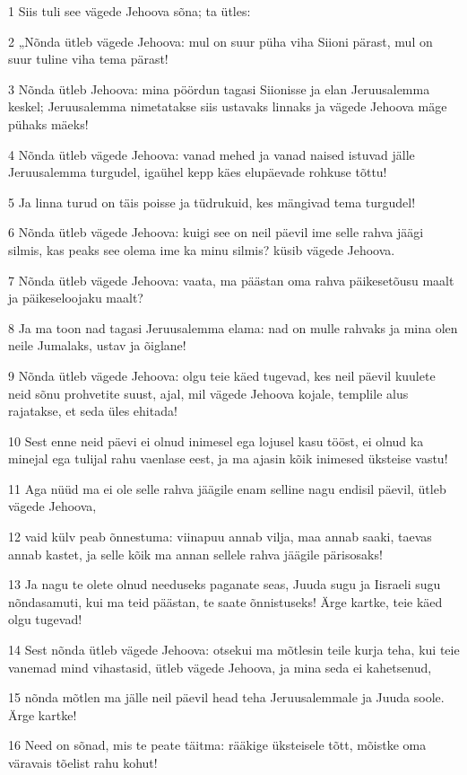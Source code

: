 \par 1 Siis tuli see vägede Jehoova sõna; ta ütles:
\par 2 „Nõnda ütleb vägede Jehoova: mul on suur püha viha Siioni pärast, mul on suur tuline viha tema pärast!
\par 3 Nõnda ütleb Jehoova: mina pöördun tagasi Siionisse ja elan Jeruusalemma keskel; Jeruusalemma nimetatakse siis ustavaks linnaks ja vägede Jehoova mäge pühaks mäeks!
\par 4 Nõnda ütleb vägede Jehoova: vanad mehed ja vanad naised istuvad jälle Jeruusalemma turgudel, igaühel kepp käes elupäevade rohkuse tõttu!
\par 5 Ja linna turud on täis poisse ja tüdrukuid, kes mängivad tema turgudel!
\par 6 Nõnda ütleb vägede Jehoova: kuigi see on neil päevil ime selle rahva jäägi silmis, kas peaks see olema ime ka minu silmis? küsib vägede Jehoova.
\par 7 Nõnda ütleb vägede Jehoova: vaata, ma päästan oma rahva päikesetõusu maalt ja päikeseloojaku maalt?
\par 8 Ja ma toon nad tagasi Jeruusalemma elama: nad on mulle rahvaks ja mina olen neile Jumalaks, ustav ja õiglane!
\par 9 Nõnda ütleb vägede Jehoova: olgu teie käed tugevad, kes neil päevil kuulete neid sõnu prohvetite suust, ajal, mil vägede Jehoova kojale, templile alus rajatakse, et seda üles ehitada!
\par 10 Sest enne neid päevi ei olnud inimesel ega lojusel kasu tööst, ei olnud ka minejal ega tulijal rahu vaenlase eest, ja ma ajasin kõik inimesed üksteise vastu!
\par 11 Aga nüüd ma ei ole selle rahva jäägile enam selline nagu endisil päevil, ütleb vägede Jehoova,
\par 12 vaid külv peab õnnestuma: viinapuu annab vilja, maa annab saaki, taevas annab kastet, ja selle kõik ma annan sellele rahva jäägile pärisosaks!
\par 13 Ja nagu te olete olnud needuseks paganate seas, Juuda sugu ja Iisraeli sugu nõndasamuti, kui ma teid päästan, te saate õnnistuseks! Ärge kartke, teie käed olgu tugevad!
\par 14 Sest nõnda ütleb vägede Jehoova: otsekui ma mõtlesin teile kurja teha, kui teie vanemad mind vihastasid, ütleb vägede Jehoova, ja mina seda ei kahetsenud,
\par 15 nõnda mõtlen ma jälle neil päevil head teha Jeruusalemmale ja Juuda soole. Ärge kartke!
\par 16 Need on sõnad, mis te peate täitma: rääkige üksteisele tõtt, mõistke oma väravais tõelist rahu kohut!
